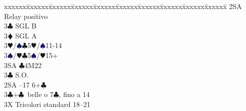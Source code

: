 \documentclass[a4paper,italian]{article}
\newcommand{\BC}{\textcolor{OliveGreen}{$\clubsuit$}}
\newcommand{\BD}{\textcolor{RedOrange}{$\vardiamondsuit$}}
\newcommand{\BH}{\textcolor{Red2}{$\varheartsuit${}}}
\newcommand{\BS}{\textcolor{MidnightBlue}{$\spadesuit${}}}
\newenvironment{bidtable}
{\begin{tabbing}

    xxxxxx\=xxxxxx\=xxxxxx\=xxxxxx\=xxxxxx\=xxxxxx\=xxxxxx\=xxxxxx\=xxxxxx\=xxxxxx\=\kill}
{\end{tabbing} }%
\begin{document}
\begin{multicols}{2}
\begin{bidtable}
                                        2SA \> Relay positivo\+\\
                                        3\BC \> SGL B\\
                                        3\BD \> SGL A\\
                                        3\BH/\BS {}\BC 5\BH/\BS 11-14\\
                                        3\BS/\BH {}\BC 5\BS/\BH 15+\\
                                        3SA \BC 4M22\-\\
                                        3\BC \> S.O.\-\\
                                        2SA --17 6+\BC \\
                                        3\BC {}+\BC\ belle o 7\BC , fino a 14\\
                                        3X \> Tricolori standard 18--21\-
                                    \end{bidtable}
                                \end{multicols}
                                \newpage
\end{document}
